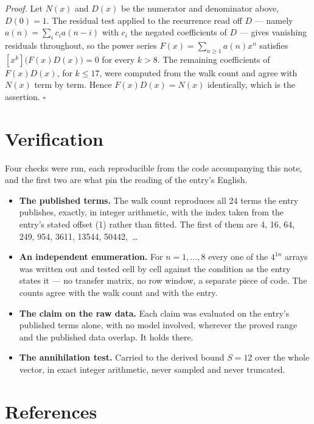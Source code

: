 \documentclass[11pt]{article}
\theoremstyle{definition}
\begin{document}
{\itshape Proof.} Let $N(x)$ and $D(x)$ be the numerator and denominator above, $D(0)=1$. The residual test applied to the recurrence read off $D$ --- namely $a(n) = \sum_i c_i a(n-i)$ with $c_i$ the negated coefficients of $D$ --- gives vanishing residuals throughout, so the power series $F(x)=\sum_{n\ge 1}a(n)x^n$ satisfies $[x^k]\bigl(F(x)D(x)\bigr) = 0$ for every $k > 8$. The remaining coefficients of $F(x)D(x)$, for $k \le 17$, were computed from the walk count and agree with $N(x)$ term by term. Hence $F(x)D(x) = N(x)$ identically, which is the assertion. $\square$

\section{Verification}

Four checks were run, each reproducible from the code accompanying this note, and the first two are what pin the reading of the entry's English.

\begin{itemize}

\item {\bfseries The published terms.} The walk count reproduces all 24 terms the entry publishes, exactly, in integer arithmetic, with the index taken from the entry's stated offset (1) rather than fitted. The first of them are 4, 16, 64, 249, 954, 3611, 13544, 50442,~\dots

\item {\bfseries An independent enumeration.} For $n = 1,\dots,8$ every one of the $4^{1n}$ arrays was written out and tested cell by cell against the condition as the entry states it --- no transfer matrix, no row window, a separate piece of code. The counts agree with the walk count and with the entry.

\item {\bfseries The claim on the raw data.} Each claim was evaluated on the entry's published terms alone, with no model involved, wherever the proved range and the published data overlap. It holds there.

\item {\bfseries The annihilation test.} Carried to the derived bound $S = 12$ over the whole vector, in exact integer arithmetic, never sampled and never truncated.

\end{itemize}

\section{References}
\end{document}
